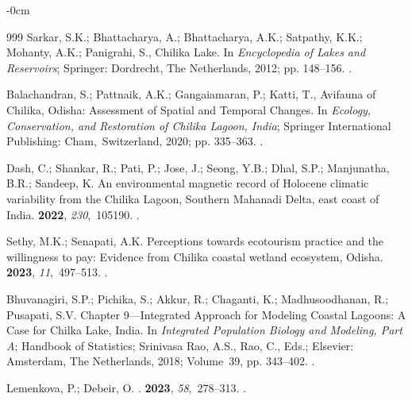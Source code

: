\documentclass[jmse,article,accept,pdftex,oneauthor]{Definitions/mdpi}
\begin{document}
\begin{adjustwidth}{-\extralength}{0cm}
\begin{thebibliography}{999}
Sarkar, S.K.; Bhattacharya, A.; Bhattacharya, A.K.; Satpathy, K.K.; Mohanty,
  A.K.; Panigrahi, S., Chilika Lake.
\newblock In {\em Encyclopedia of Lakes and Reservoirs}; Springer: Dordrecht, The Netherlands, 2012; pp. 148--156.
.

Balachandran, S.; Pattnaik, A.K.; Gangaiamaran, P.; Katti, T., Avifauna of
  Chilika, Odisha: Assessment of Spatial and Temporal Changes.
\newblock In {\em Ecology, Conservation, and Restoration of Chilika Lagoon,
  India}; Springer International Publishing: Cham,~Switzerland, 2020; pp. 335--363.
.

Dash, C.; Shankar, R.; Pati, P.; Jose, J.; Seong, Y.B.; Dhal, S.P.; Manjunatha,
  B.R.; Sandeep, K.
\newblock An environmental magnetic record of Holocene climatic variability
  from the Chilika Lagoon, Southern Mahanadi Delta, east coast of India.
 {\bf 2022}, {\em 230},~105190.
.

Sethy, M.K.; Senapati, A.K.
\newblock Perceptions towards ecotourism practice and the willingness to pay:
  Evidence from Chilika coastal wetland ecosystem, Odisha.
 {\bf 2023}, {\em
  11},~497--513.
.

Bhuvanagiri, S.P.; Pichika, S.; Akkur, R.; Chaganti, K.; Madhusoodhanan, R.;
  Pusapati, S.V.
\newblock Chapter 9---Integrated Approach for Modeling Coastal Lagoons: A Case
  for Chilka Lake, India. In {\em Integrated Population Biology and Modeling,
  Part A}; Handbook of Statistics; {Srinivasa Rao}, A.S., Rao, C., Eds.; Elsevier:  {Amsterdam, The Netherlands,} %
  2018; Volume~39, pp. 343--402.
.

Lemenkova, P.; Debeir, O.
.
 {\bf 2023}, {\em 58},~278--313.
.


\end{thebibliography}
\end{adjustwidth}
\end{document}

